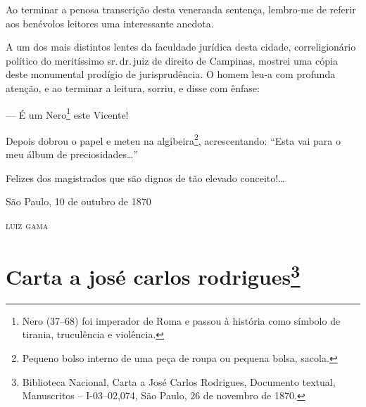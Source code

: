Ao terminar a penosa transcrição desta veneranda sentença, lembro-me de
referir aos benévolos leitores uma interessante anedota.

A um dos mais distintos lentes da faculdade jurídica desta cidade,
correligionário político do meritíssimo sr.\,dr.\,juiz de direito de
Campinas, mostrei uma cópia deste monumental prodígio de jurisprudência.
O homem leu-a com profunda atenção, e ao terminar a leitura, sorriu, e
disse com ênfase:

--- É um Nero\footnote{ Nero (37--68) foi imperador de Roma e passou à
  história como símbolo de tirania, truculência e violência.} este
Vicente!

Depois dobrou o papel e meteu na algibeira\footnote{ Pequeno bolso
  interno de uma peça de roupa ou pequena bolsa, sacola.},
acrescentando: ``Esta vai para o meu álbum de preciosidades\ldots{}''

Felizes dos magistrados que são dignos de tão elevado conceito!\ldots{}

\begin{flushright}
São Paulo, 10 de outubro de 1870

\textsc{luiz gama}
\end{flushright}

\chapter{Carta a josé carlos rodrigues\footnote{Biblioteca Nacional, Carta a José Carlos Rodrigues,
  Documento textual, Manuscritos -- I-03--02,074, São Paulo, 26 de novembro de 1870.}} %

